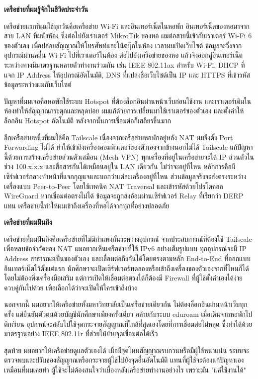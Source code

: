 \textbf{เครือข่ายที่ผมรู้จักในชีวิตประจำวัน}

เครือข่ายแรกที่ผมใช้ทุกวันคือเครือข่าย Wi-Fi และอินเทอร์เน็ตในหอพัก อินเทอร์เน็ตของหอมาจากสาย LAN ที่ผนังห้อง ซึ่งต่อไปยังเราเตอร์ MikroTik ของหอ ผมต่อสายนี้เข้ากับเราเตอร์ Wi-Fi 6 ของตัวเอง เพื่อปล่อยสัญญาณให้โทรศัพท์และโน้ตบุ๊กในห้อง เวลาผมเปิดเว็บไซต์ ข้อมูลจะวิ่งจากอุปกรณ์ผ่านคลื่น Wi-Fi ไปที่เราเตอร์ในห้อง ต่อไปยังเครือข่ายของหอ แล้วจึงออกสู่อินเทอร์เน็ต ระหว่างทางมีมาตรฐานหลายตัวทำงานร่วมกัน เช่น IEEE 802.11ax สำหรับ Wi-Fi, DHCP ที่แจก IP Address ให้อุปกรณ์อัตโนมัติ, DNS ที่แปลงชื่อเว็บไซต์เป็น IP และ HTTPS ที่เข้ารหัสข้อมูลระหว่างผมกับเว็บไซต์

ปัญหาที่ผมเจอคือหอพักใช้ระบบ Hotspot ที่ต้องล็อกอินผ่านหน้าเว็บก่อนใช้งาน และเราเตอร์เดิมในห้องทำให้สัญญาณกระตุกและหลุดบ่อย ผมแก้ด้วยการเปลี่ยนมาใช้เราเตอร์ของตัวเอง และตั้งค่าให้ล็อกอิน Hotspot อัตโนมัติ หลังจากนั้นการเชื่อมต่อก็เสถียรขึ้นมาก

อีกเครือข่ายหนึ่งที่ผมใช้คือ Tailscale เนื่องจากเครือข่ายหอพักอยู่หลัง NAT ผมจึงตั้ง Port Forwarding ไม่ได้ ทำให้เข้าถึงเครื่องคอมพิวเตอร์ของตัวเองจากข้างนอกไม่ได้ Tailscale แก้ปัญหานี้ด้วยการสร้างเครือข่ายส่วนตัวเสมือน (Mesh VPN) ทุกเครื่องที่อยู่ในเครือข่ายจะได้ IP ส่วนตัวในช่วง 100.x.x.x และสื่อสารกันได้เหมือนอยู่ใน LAN เดียวกัน ไม่ว่าจะอยู่ที่ไหน หลักการคือมีเซิร์ฟเวอร์กลางทำหน้าที่แจกกุญแจและบอกว่าแต่ละเครื่องอยู่ที่ไหน ส่วนข้อมูลจริงจะส่งตรงระหว่างเครื่องแบบ Peer-to-Peer โดยใช้เทคนิค NAT Traversal และเข้ารหัสด้วยโปรโตคอล WireGuard หากเชื่อมต่อตรงไม่ได้ ข้อมูลจะถูกส่งอ้อมผ่านเซิร์ฟเวอร์ Relay ที่เรียกว่า DERP แทน เครือข่ายนี้ทำให้ผมเข้าถึงเครื่องที่หอได้จากทุกที่อย่างปลอดภัย

\textbf{เครือข่ายที่ผมฝันถึง}

เครือข่ายที่ผมฝันถึงคือเครือข่ายที่ไม่มีกำแพงกั้นระหว่างอุปกรณ์ จากประสบการณ์ที่ต้องใช้ Tailscale เพื่อหลบข้อจำกัดของ NAT ผมอยากเห็นเครือข่ายที่ใช้ IPv6 อย่างเต็มรูปแบบ ทุกอุปกรณ์จะมี IP Address สาธารณะเป็นของตัวเอง และเชื่อมต่อถึงกันได้โดยตรงตามหลัก End-to-End ที่ออกแบบอินเทอร์เน็ตไว้ตั้งแต่แรก นักศึกษาจะเปิดเซิร์ฟเวอร์ทดลองหรือเข้าถึงเครื่องของตัวเองจากที่ไหนก็ได้ โดยไม่ต้องพึ่งเครื่องมือเสริม แต่การเปิดให้เชื่อมต่อตรงได้ก็ต้องมี Firewall ที่ผู้ใช้ตั้งค่าเองได้ง่ายควบคู่กันไปด้วย เพื่อเลือกได้ว่าจะเปิดให้ใครเข้าถึงบ้าง

นอกจากนี้ ผมอยากให้เครือข่ายทั้งมหาวิทยาลัยเป็นเครือข่ายเดียวกัน ไม่ต้องล็อกอินผ่านหน้าเว็บทุกครั้ง แต่ยืนยันตัวตนด้วยบัญชีนักศึกษาเพียงครั้งเดียว คล้ายกับระบบ eduroam เมื่อเดินจากหอพักไปตึกเรียน อุปกรณ์จะสลับไปใช้จุดกระจายสัญญาณที่ใกล้ที่สุดเองโดยที่การเชื่อมต่อไม่หลุด ซึ่งทำได้ด้วยมาตรฐานอย่าง IEEE 802.11r ที่ช่วยให้ย้ายจุดเชื่อมต่อได้เร็ว

สุดท้าย ผมอยากให้เครือข่ายดูแลตัวเองได้ เมื่อมีจุดไหนสัญญาณรบกวนหรือมีผู้ใช้หนาแน่น ระบบจะตรวจพบและปรับช่องสัญญาณหรือกระจายผู้ใช้ไปยังจุดอื่นอัตโนมัติ แทนที่ผู้ใช้จะต้องแก้ปัญหาเองเหมือนที่ผมเคยทำ ผู้ใช้จะไม่ต้องสนใจว่าเบื้องหลังเครือข่ายทำงานอย่างไร เพราะมัน "แค่ใช้งานได้"
